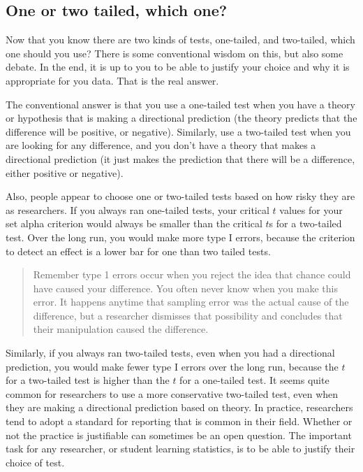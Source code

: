 \documentclass[
  letterpaper,
  DIV=11,
  numbers=noendperiod]{scrreprt}
\begin{document}
\subsection{One or two tailed, which
one?}\label{one-or-two-tailed-which-one}

Now that you know there are two kinds of tests, one-tailed, and
two-tailed, which one should you use? There is some conventional wisdom
on this, but also some debate. In the end, it is up to you to be able to
justify your choice and why it is appropriate for you data. That is the
real answer.

The conventional answer is that you use a one-tailed test when you have
a theory or hypothesis that is making a directional prediction (the
theory predicts that the difference will be positive, or negative).
Similarly, use a two-tailed test when you are looking for any
difference, and you don't have a theory that makes a directional
prediction (it just makes the prediction that there will be a
difference, either positive or negative).

Also, people appear to choose one or two-tailed tests based on how risky
they are as researchers. If you always ran one-tailed tests, your
critical \(t\) values for your set alpha criterion would always be
smaller than the critical \(t\)s for a two-tailed test. Over the long
run, you would make more type I errors, because the criterion to detect
an effect is a lower bar for one than two tailed tests.

\begin{quote}
Remember type 1 errors occur when you reject the idea that chance could
have caused your difference. You often never know when you make this
error. It happens anytime that sampling error was the actual cause of
the difference, but a researcher dismisses that possibility and
concludes that their manipulation caused the difference.
\end{quote}

Similarly, if you always ran two-tailed tests, even when you had a
directional prediction, you would make fewer type I errors over the long
run, because the \(t\) for a two-tailed test is higher than the \(t\)
for a one-tailed test. It seems quite common for researchers to use a
more conservative two-tailed test, even when they are making a
directional prediction based on theory. In practice, researchers tend to
adopt a standard for reporting that is common in their field. Whether or
not the practice is justifiable can sometimes be an open question. The
important task for any researcher, or student learning statistics, is to
be able to justify their choice of test.
\end{document}
